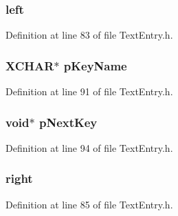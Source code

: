 \subsubsection[{left}]{ left}\label{struct_k_e_y_m_e_m_b_e_r_a24b9199fd8600849a2a3f9933474789d}


Definition at line 83 of file Text\+Entry.\+h.

\hypertarget{struct_k_e_y_m_e_m_b_e_r_a57105db8fa0e820d6255178441ef7dd2}{}
\subsubsection[{p\+Key\+Name}]{\setlength{\rightskip}{0pt plus 5cm}X\+C\+H\+A\+R$\ast$ p\+Key\+Name}\label{struct_k_e_y_m_e_m_b_e_r_a57105db8fa0e820d6255178441ef7dd2}


Definition at line 91 of file Text\+Entry.\+h.

\hypertarget{struct_k_e_y_m_e_m_b_e_r_a85401413b32441191ae69404967d9f29}{}
\subsubsection[{p\+Next\+Key}]{\setlength{\rightskip}{0pt plus 5cm}void$\ast$ p\+Next\+Key}\label{struct_k_e_y_m_e_m_b_e_r_a85401413b32441191ae69404967d9f29}


Definition at line 94 of file Text\+Entry.\+h.

\hypertarget{struct_k_e_y_m_e_m_b_e_r_aa414475e19c55ba5db1b1f485f5e3785}{}
\subsubsection[{right}]{ right}\label{struct_k_e_y_m_e_m_b_e_r_aa414475e19c55ba5db1b1f485f5e3785}


Definition at line 85 of file Text\+Entry.\+h.

\hypertarget{struct_k_e_y_m_e_m_b_e_r_a5d717a64978f34c9afb8ae23374160a0}{}
